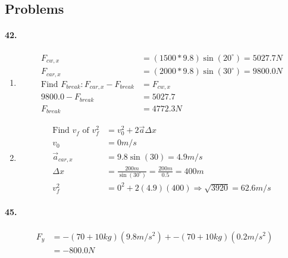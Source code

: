     \subsection*{Problems}

    \paragraph*{42.}\mbox{}

    \begin{enumerate}[label=\alph*.]
        \item 

        \begin{align*}
            F_{cw,x}    & = (1500*9.8)\sin(20^{\circ}) = 5027.7 N       \\
            F_{car,x}   & = (2000*9.8)\sin(30^{\circ}) = 9800.0 N       \\
            \text{Find } F_{break}: F_{car, x} - F_{break} & = F_{cw,x} \\
            9800.0 - F_{break} & = 5027.7                               \\
            F_{break}   & = \boxed{4772.3 N}
        \end{align*}

        \item

        \begin{align*}
            \text{Find $v_{f}$ of } v_{f}^{2}   
                                & = v_{0}^{2} + 2\vec{a}\Delta x        \\
            v_{0}               & = 0 m/s                               \\
            \vec{a}_{car,x}     & = 9.8\sin(30) = 4.9 m/s               \\
            \Delta x            & = \frac{200m}{\sin(30^{\circ})}
                                  = \frac{200m}{0.5} = 400 m            \\
            v_{f}^{2}           & = 0^{2} + 2(4.9)(400)     
                                  \Rightarrow \sqrt{3920} = \boxed{62.6m/s}
        \end{align*}
    \end{enumerate}

    \paragraph*{45.}\mbox{}

    \begin{align*}
        F_{y}   & = -(70 + 10 kg)(9.8m/s^{2}) + -(70 + 10 kg)(0.2m/s^{2})   \\
                & = \boxed{-800.0 N}
    \end{align*}

